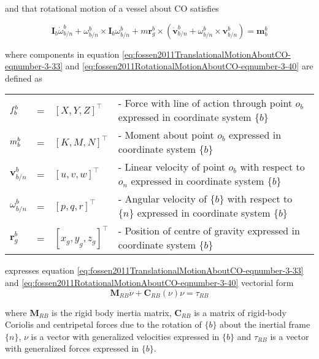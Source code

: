 and that rotational motion of a vessel about CO satisfies

\begin{equation} 
\textbf{I}_b  \dot{\omega}_{b/n}^{b} + \omega_{b/n}^{b}  \times \textbf{I}_b \omega_{b/n}^{b}  + m \textbf{r}_g^b \times  ( \dot{\textbf{v}}_{b/n}^{b} +   	\omega_{b/n}^{b} 	 \times	\textbf{v}_{b/n}^{b}	) = \textbf{m}_b^b 
\label{eq:fossen2011RotationalMotionAboutCO-eqnumber-3-40} 
\end{equation}

where components in equation \ref{eq:fossen2011TranslationalMotionAboutCO-eqnumber-3-33} and \ref{eq:fossen2011RotationalMotionAboutCO-eqnumber-3-40} are defined as

\begin{table}[H]
	\centering
	\begin{tabular}{llll}
		$\boldmath{f}^{b}_{b} $ 	   	& = & $[X,Y,Z]^\top$ 		&	- Force with line of action through point $o_b$ expressed in coordinate system $\{b\}$ \\[5pt]
		$\boldmath{m}^{b}_{b} $   		& = & $[K,M,N]^\top$ 		&	- Moment about point $o_b$ expressed in coordinate system $\{b\}$ \\[5pt]
		$ \textbf{v}^{b}_{b/n}$   		& = & $[u,v,w]^\top$ 		&	- Linear velocity of point $o_b$ with respect to $o_n$ expressed in coordinate system $\{b\}$ \\[5pt]
		$ \omega^{b}_{b/n}$   			& = & $[p,q,r]^\top$ 		&	- Angular velocity of $\{b\}$ with respect to $\{n\}$ expressed in coordinate system $\{b\}$  \\[5pt]
		$\textbf{r}^{b}_{g} $ 			& = & $[x_g,y_g,z_g]^\top$ 	&	- Position of centre of gravity expressed in coordinate system $\{b\}$ 
	\end{tabular}
\end{table}

\citet{fossen1994guidance} expresses equation \ref{eq:fossen2011TranslationalMotionAboutCO-eqnumber-3-33} and \ref{eq:fossen2011RotationalMotionAboutCO-eqnumber-3-40} vectorial form
\begin{equation}
\textbf{M}_{RB} \dot{\nu} + \textbf{C}_{RB}(\nu)\nu  = \tau_{RB}
\label{eq:fossen1994RigidBodyKinetics1}
\end{equation}

where $ \textbf{M}_{RB} $ is the rigid body inertia matrix, $\textbf{C}_{RB}$ is a matrix of rigid-body Coriolis and centripetal forces due to the rotation of $\{b\}$ about the inertial frame $\{n\}$, $\nu$ is a vector with generalized velocities expressed in $\{b\}$ and $\tau_{RB}$ is a vector with generalized forces expressed in $\{b\}$. 

